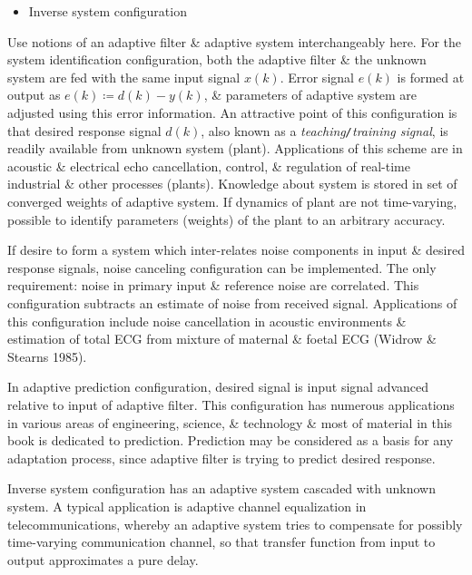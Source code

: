 \documentclass{article}
\begin{document}
\begin{enumerate}
\begin{itemize}
\begin{itemize}
\begin{itemize}
\begin{itemize}
					\item Inverse system configuration
				\end{itemize}
				Use notions of an adaptive filter \& adaptive system interchangeably here. For the system identification configuration, both the adaptive filter \& the unknown system are fed with the same input signal $x(k)$. Error signal $e(k)$ is formed at output as $e(k)\coloneqq d(k) - y(k)$, \& parameters of adaptive system are adjusted using this error information. An attractive point of this configuration is that desired response signal $d(k)$, also known as a {\it teaching{\tt/}training signal}, is readily available from unknown system (plant). Applications of this scheme are in acoustic \& electrical echo cancellation, control, \& regulation of real-time industrial \& other processes (plants). Knowledge about system is stored in set of converged weights of adaptive system. If dynamics of plant are not time-varying, possible to identify parameters (weights) of the plant to an arbitrary accuracy.
				
				If desire to form a system which inter-relates noise components in input \& desired response signals, noise canceling configuration can be implemented. The only requirement: noise in primary input \& reference noise are correlated. This configuration subtracts an estimate of noise from received signal. Applications of this configuration include noise cancellation in acoustic environments \& estimation of total ECG from mixture of maternal \& foetal ECG (Widrow \& Stearns 1985).
				
				In adaptive prediction configuration, desired signal is input signal advanced relative to input of adaptive filter. This configuration has numerous applications in various areas of engineering, science, \& technology \& most of material in this book is dedicated to prediction. Prediction may be considered as a basis for any adaptation process, since adaptive filter is trying to predict desired response.
				
				Inverse system configuration has an adaptive system cascaded with unknown system. A typical application is adaptive channel equalization in telecommunications, whereby an adaptive system tries to compensate for possibly time-varying communication channel, so that transfer function from input to output approximates a pure delay.
				

\end{itemize}
\end{itemize}
\end{itemize}
\end{enumerate}
\end{document}
